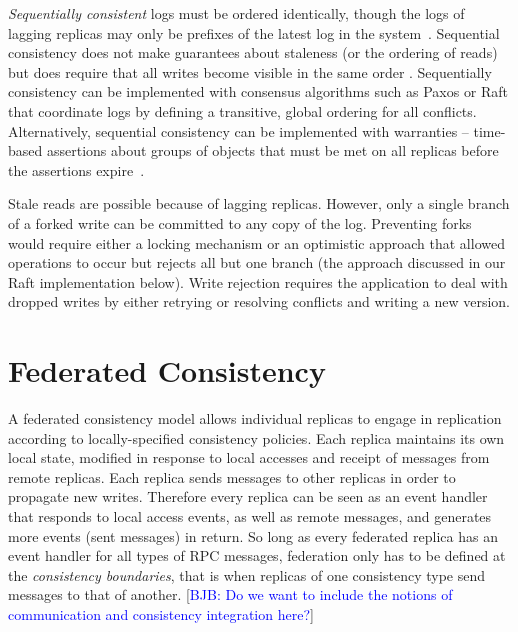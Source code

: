 \documentclass[10pt,conference,letterpaper]{IEEEtran}
\newcommand{\blue}[1]{{\textcolor{blue}{#1}}}
\newcommand{\bjb}[1]{[\blue{BJB: #1}]}
\begin{document}
\emph{Sequentially consistent} logs must be ordered identically, though the logs of
lagging replicas may only be prefixes of the latest log in the system~\cite{attiya_sequential_1994}.
Sequential consistency does not make guarantees about staleness
(or the ordering of reads) but does require that all writes become visible in the same
order \cite{bermbach_consistency_2013}.
Sequentially consistency can be implemented with consensus algorithms such as Paxos
\cite{lamport_fast_2006} or Raft \cite{ongaro_search_2014} that coordinate logs by
defining a transitive, global ordering for all conflicts.
Alternatively, sequential consistency can be implemented with warranties -- time-based
assertions about groups of objects that must be met on all replicas before the assertions
expire~\cite{liu_warranties_2014}.

Stale reads are possible because of lagging replicas.
However, only a single branch of a forked write can be committed to any copy of the log.
Preventing forks would require either a locking mechanism or an optimistic approach that
allowed operations to occur but rejects all but one branch (the approach discussed in our
Raft implementation below).
Write rejection requires the application to deal with dropped writes by either retrying or
resolving conflicts and writing a new version.

\section{Federated Consistency}

A federated consistency model allows individual replicas to
engage in replication according to locally-specified consistency policies.
Each replica maintains its own local state, modified in response to local accesses
and receipt of messages from remote replicas.
Each replica sends messages to other replicas in order to propagate new writes.
Therefore every replica can be seen as an event handler that responds to local access
events, as well as remote messages, and generates more events (sent messages) in return.
So long as every federated replica has an event handler for all types of RPC
messages, federation only has to be defined at the \textit{consistency boundaries}, that
is when replicas of one consistency type send messages to that of another. \bjb{Do we want to include the notions of communication and consistency integration here?}

\end{document}
